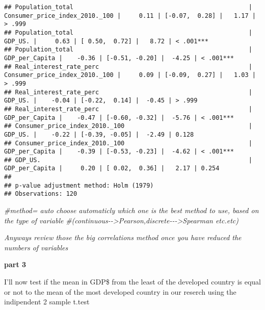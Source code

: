 \documentclass[
]{article}
\newenvironment{Shaded}{\begin{snugshade}}{\end{snugshade}}
\newcommand{\CommentTok}[1]{\textcolor[rgb]{0.56,0.35,0.01}{\textit{#1}}}
\begin{document}
\begin{verbatim}
## Population_total                                                |                                  Consumer_price_index_2010._100 |     0.11 | [-0.07,  0.28] |   1.17 | > .999   
## Population_total                                                |                                                         GDP_US. |     0.63 | [ 0.50,  0.72] |   8.72 | < .001***
## Population_total                                                |                                                  GDP_per_Capita |    -0.36 | [-0.51, -0.20] |  -4.25 | < .001***
## Real_interest_rate_perc                                         |                                  Consumer_price_index_2010._100 |     0.09 | [-0.09,  0.27] |   1.03 | > .999   
## Real_interest_rate_perc                                         |                                                         GDP_US. |    -0.04 | [-0.22,  0.14] |  -0.45 | > .999   
## Real_interest_rate_perc                                         |                                                  GDP_per_Capita |    -0.47 | [-0.60, -0.32] |  -5.76 | < .001***
## Consumer_price_index_2010._100                                  |                                                         GDP_US. |    -0.22 | [-0.39, -0.05] |  -2.49 | 0.128    
## Consumer_price_index_2010._100                                  |                                                  GDP_per_Capita |    -0.39 | [-0.53, -0.23] |  -4.62 | < .001***
## GDP_US.                                                         |                                                  GDP_per_Capita |     0.20 | [ 0.02,  0.36] |   2.17 | 0.254    
## 
## p-value adjustment method: Holm (1979)
## Observations: 120
\end{verbatim}

\begin{Shaded}
\begin{Highlighting}[]
\CommentTok{\#method= auto choose automaticly which one is the best method to use, based on the type of variable}
\CommentTok{\#(continuous{-}{-}\textgreater{}Pearson,discrete{-}{-}{-}\textgreater{}Spearman etc.etc)}
\end{Highlighting}
\end{Shaded}

\emph{Anyways review those the big correlations method once you have
reduced the numbers of variables}

\textbf{part 3}

I'll now test if the mean in GDP\$ from the least of the developed
country is equal or not to the mean of the most developed country in our
reserch using the indipendent 2 sample t.test
\end{document}
